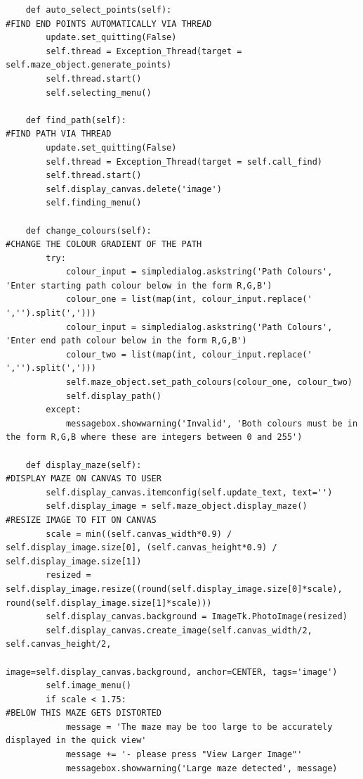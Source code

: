 \documentclass[titlepage]{article}
\begin{document}
\begin{changemargin}{-1in}{-1in}
\begin{verbatim}
    def auto_select_points(self):                                               #FIND END POINTS AUTOMATICALLY VIA THREAD
        update.set_quitting(False)
        self.thread = Exception_Thread(target = self.maze_object.generate_points)
        self.thread.start()
        self.selecting_menu()                           

    def find_path(self):                                                        #FIND PATH VIA THREAD
        update.set_quitting(False)
        self.thread = Exception_Thread(target = self.call_find)
        self.thread.start()
        self.display_canvas.delete('image')
        self.finding_menu()

    def change_colours(self):                                                   #CHANGE THE COLOUR GRADIENT OF THE PATH
        try:
            colour_input = simpledialog.askstring('Path Colours', 'Enter starting path colour below in the form R,G,B')
            colour_one = list(map(int, colour_input.replace(' ','').split(',')))
            colour_input = simpledialog.askstring('Path Colours', 'Enter end path colour below in the form R,G,B')
            colour_two = list(map(int, colour_input.replace(' ','').split(',')))
            self.maze_object.set_path_colours(colour_one, colour_two)
            self.display_path()
        except:
            messagebox.showwarning('Invalid', 'Both colours must be in the form R,G,B where these are integers between 0 and 255')

    def display_maze(self):                                                     #DISPLAY MAZE ON CANVAS TO USER
        self.display_canvas.itemconfig(self.update_text, text='')
        self.display_image = self.maze_object.display_maze()                    #RESIZE IMAGE TO FIT ON CANVAS
        scale = min((self.canvas_width*0.9) / self.display_image.size[0], (self.canvas_height*0.9) / self.display_image.size[1])
        resized = self.display_image.resize((round(self.display_image.size[0]*scale), round(self.display_image.size[1]*scale)))
        self.display_canvas.background = ImageTk.PhotoImage(resized)
        self.display_canvas.create_image(self.canvas_width/2, self.canvas_height/2,
                                         image=self.display_canvas.background, anchor=CENTER, tags='image')
        self.image_menu()
        if scale < 1.75:                                                        #BELOW THIS MAZE GETS DISTORTED
            message = 'The maze may be too large to be accurately displayed in the quick view'
            message += '- please press "View Larger Image"'
            messagebox.showwarning('Large maze detected', message)
        

\end{verbatim}
\end{changemargin}
\end{document}
